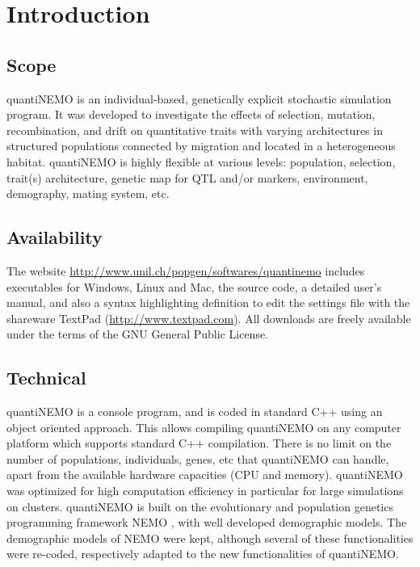 \documentclass[letterpaper,12pt,oneside]{book}
\begin{document}
\frontmatter
\setcounter{tocdepth}{3}
\tableofcontents



\mainmatter
\setcounter{secnumdepth}{3}


\chapter{Introduction}

\section{Scope}
quantiNEMO is an individual-based, genetically explicit stochastic simulation program. It was developed to investigate the effects of selection, mutation, recombination, and drift on quantitative traits with varying architectures in structured populations connected by migration and located in a heterogeneous habitat. quantiNEMO is highly flexible at various levels: population, selection, trait(s) architecture, genetic map for QTL and/or markers, environment, demography, mating system, etc.

\section{Availability}
The website \linebreak\url{http://www.unil.ch/popgen/softwares/quantinemo} includes executables for Windows, Linux and Mac, the source code, a detailed user's manual, and also a syntax highlighting definition to edit the settings file with the shareware TextPad (\linebreak\url{http://www.textpad.com}). All downloads are freely available under the terms of the GNU General Public License.

\section{Technical}
quantiNEMO is a console program, and is coded in standard C++ using an object oriented approach. This allows compiling quantiNEMO on any computer platform which supports standard C++ compilation. There is no limit on the number of populations, individuals, genes, etc that quantiNEMO can handle, apart from the available hardware capacities (CPU and memory). quantiNEMO was optimized for high computation efficiency in particular for large simulations on clusters. quantiNEMO is built on the evolutionary and population genetics programming framework NEMO \citep{Guillaume_2006}, with well developed demographic models. The demographic models of NEMO were kept, although several of these functionalities were re-coded, respectively adapted to the new functionalities of quantiNEMO.
\end{document}
